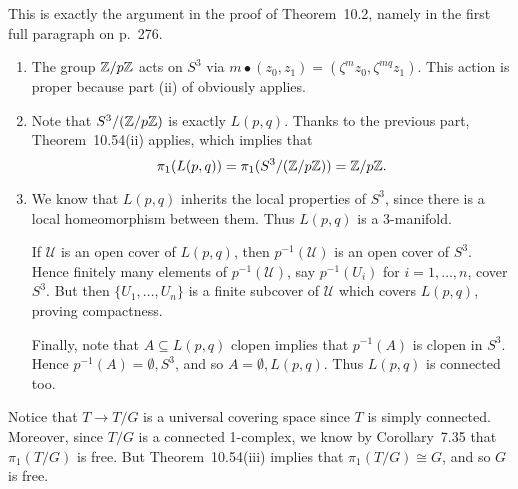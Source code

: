 \documentclass[../../solutions.tex]{subfiles}
\begin{document}
\begin{exercise} \leavevmode
This is exactly the argument in the proof of Theorem~10.2, namely in the first full paragraph on p.~276.
\end{exercise}

\begin{exercise} \leavevmode
\begin{enumerate}
\item
The group $\mathbb{Z}/p\mathbb{Z}$ acts on $S^3$ via $m\bullet(z_0,z_1)=(\zeta^mz_0,\zeta^{mq}z_1)$.
This action is proper because part (ii) of  obviously applies.

\item
Note that $S^3/(\mathbb{Z}/p\mathbb{Z})$ is exactly $L(p,q)$.
Thanks to the previous part, Theorem~10.54(ii) applies, which implies that
\[\pi_1(L(p,q))=\pi_1(S^3/(\mathbb{Z}/p\mathbb{Z}))=\mathbb{Z}/p\mathbb{Z}.\]

\item
We know that $L(p,q)$ inherits the local properties of $S^3$, since there is a local homeomorphism between them.
Thus $L(p,q)$ is a 3-manifold.

If $\mathcal U$ is an open cover of $L(p,q)$, then $p^{-1}(\mathcal U)$ is an open cover of $S^3$.
Hence finitely many elements of $p^{-1}(\mathcal U)$, say $p^{-1}(U_i)$ for $i=1,\dots,n$, cover $S^3$.
But then $\{U_1,\dots,U_n\}$ is a finite subcover of $\mathcal U$ which covers $L(p,q)$, proving compactness.

Finally, note that $A\subseteq L(p,q)$ clopen implies that $p^{-1}(A)$ is clopen in $S^3$.
Hence $p^{-1}(A)=\emptyset,S^3$, and so $A=\emptyset,L(p,q)$.
Thus $L(p,q)$ is connected too.
\end{enumerate}
\end{exercise}

\begin{exercise} \leavevmode
Notice that $T\to T/G$ is a universal covering space since $T$ is simply connected.
Moreover, since $T/G$ is a connected 1-complex, we know by Corollary~7.35 that $\pi_1(T/G)$ is free.
But Theorem~10.54(iii) implies that $\pi_1(T/G)\cong G$, and so $G$ is free.
\end{exercise}
\end{document}
